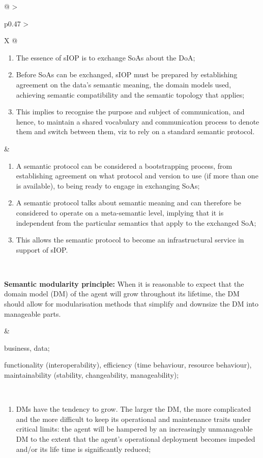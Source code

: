 \begin{xltabular}[l]{\linewidth}{@{} >{\small\raggedright\arraybackslash}p{0.47\linewidth} >{\small\raggedright\arraybackslash}X @{}}
\begin{enumerate}[left=6pt, nosep]
  \item The essence of sIOP is to exchange SoAs about the DoA;
  \item Before SoAs can be exchanged, sIOP must be prepared by establishing agreement on the data's semantic meaning, the domain models used, achieving semantic compatibility and the semantic topology that applies;
  \item This implies to recognise the purpose and subject of communication, and hence, to maintain a shared vocabulary and communication process to denote them and switch between them, viz to rely on a standard semantic protocol.
\end{enumerate}
&
\begin{enumerate}[left=10pt, nosep]
  \item A semantic protocol can be considered a bootstrapping process, from establishing agreement on what protocol and version to use (if more than one is available), to being ready to engage in exchanging SoAs;
  \item A semantic protocol talks about semantic meaning and can therefore be considered to operate on a meta-semantic level, implying that it is independent from the particular semantics that apply to the exchanged SoA;
  \item This allows the semantic protocol to become an infrastructural service in support of sIOP.
\end{enumerate} \\
%
%
%
\begin{mmdp}\label{dp:smop}{\bfseries Semantic modularity principle:}
\quad When it is reasonable to expect that the domain model (DM) of the agent will grow throughout its lifetime, the DM should allow for modularisation methods that simplify and downsize the DM into manageable parts. 
\end{mmdp}
&
\begin{description}[labelwidth=3.7cm,leftmargin=3.7cm+1ex,nosep,topsep=2ex,labelsep=1ex,font=\bfseries]
  \item[Type of information:] business, data;
  \item[Quality attributes:] functionality (interoperability), efficiency (time behaviour, resource behaviour), maintainability (stability, changeability, manageability);
\end{description} \\
\begin{enumerate}[left=6pt, nosep]
  \item DMs have the tendency to grow. The larger the DM, the more complicated and the more difficult to keep its operational and maintenance traits under critical limits: the agent will be hampered by an increasingly unmanageable DM to the extent that the agent's operational deployment becomes impeded and/or its life time is significantly reduced;

\end{enumerate}
\end{xltabular}
